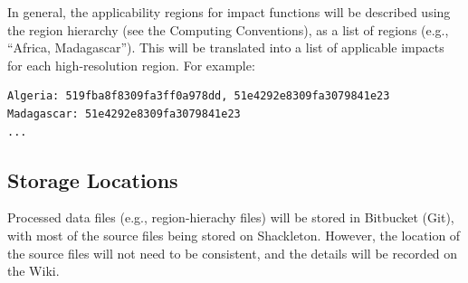 \documentclass[12pt, oneside]{amsart}
\begin{document}
In general, the applicability regions for impact functions will be
described using the region hierarchy (see the Computing Conventions),
as a list of regions (e.g., ``Africa, Madagascar'').  This will be
translated into a list of applicable impacts for each high-resolution
region.  For example:

\begin{verbatim}
Algeria: 519fba8f8309fa3ff0a978dd, 51e4292e8309fa3079841e23
Madagascar: 51e4292e8309fa3079841e23
...
\end{verbatim}

\subsection{Storage Locations}

Processed data files (e.g., region-hierachy files) will be stored in
Bitbucket (Git), with most of the source files being stored on
Shackleton.  However, the location of the source files will not need
to be consistent, and the details will be recorded on the Wiki.
\end{document}
